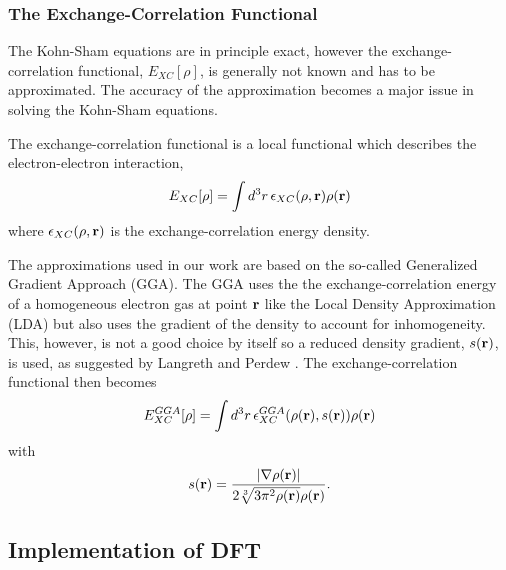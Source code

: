 \subsubsection{The Exchange-Correlation Functional}
\label{sec:XCfunctional}
The Kohn-Sham equations are in principle exact, however the exchange-correlation functional, $E_{XC}[\rho]$, is generally not known and has to be approximated. The accuracy of the approximation becomes a major issue in solving the Kohn-Sham equations.

The exchange-correlation functional is a local functional which describes the electron-electron interaction,
\begin{equation}
\label{eq:XCfunctional}
 E_{XC}[\rho] = \int d^3r\, \epsilon_{XC}(\rho, {\mathrm{\mathbf{\bm{r}}}})\rho({\mathrm{\mathbf{\bm{r}}}})
\end{equation}
where $\epsilon_{XC}(\rho, {\mathrm{\mathbf{\bm{r}}}})$ is the exchange-correlation energy density.

The approximations used in our work are based on the so-called Generalized Gradient Approach (GGA). The GGA uses the the exchange-correlation energy of a homogeneous electron gas at point ${\mathrm{\mathbf{\bm{r}}}}$ like the Local Density Approximation (LDA) \cite{kohn1965} but also uses the gradient of the density to account for inhomogeneity. This, however, is not a good choice by itself so a reduced density gradient, $s({\mathrm{\mathbf{\bm{r}}}})$, is used, as suggested by Langreth and Perdew \cite{langreth1977}. The exchange-correlation functional then becomes
\begin{equation}
  E_{XC}^{GGA}[\rho] = \int d^3r\, \epsilon_{XC}^{GGA}(\rho({\mathrm{\mathbf{\bm{r}}}}), s({\mathrm{\mathbf{\bm{r}}}}))\rho({\mathrm{\mathbf{\bm{r}}}})
\end{equation}
with
\begin{equation}
\label{eq:GGAreducedDensityGradient}
 s({\mathrm{\mathbf{\bm{r}}}}) = \frac{\left|\nabla \rho({\mathrm{\mathbf{\bm{r}}}})\right|}{2\sqrt[3]{3\pi^2\rho({\mathrm{\mathbf{\bm{r}}}})} \rho({\mathrm{\mathbf{\bm{r}}}})}.
\end{equation}

\subsection{Implementation of DFT}
\label{sec:methods-dft-implemetnation}

